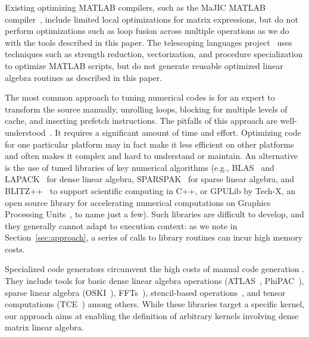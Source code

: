 \documentclass[runningheads]{llncs}
\begin{document}
Existing optimizing MATLAB compilers, such as the MaJIC MATLAB compiler~\cite{MaJIC},
include limited local optimizations for matrix expressions, but do not
perform optimizations such as loop fusion across multiple operations as we do
with the tools described in this paper. The telescoping languages
project~\cite{telescopingurl,teleoverview,Ken99} uses techniques such as
strength reduction, vectorization, and procedure specialization to optimize
MATLAB scripts, but do not generate reusable optimized linear algebra
routines as described in this paper.

The most common approach to tuning numerical codes is for an expert to
transform the source manually, unrolling loops, blocking for multiple levels
of cache, and inserting prefetch instructions.  The pitfalls of this approach
are well-understood~\cite{Goedecker01}.  It requires a significant amount of
time and effort. Optimizing code for one particular platform may in fact make
it less efficient on other platforms and often makes it complex and hard to
understand or maintain.  An alternative is the use of tuned libraries of key
numerical algorithms (e.g., BLAS~\cite{Dongarra:1990fk} and
LAPACK~\cite{LAPACK} for dense linear algebra, SPARSPAK~\cite{sparspak} for
sparse linear algebra, and BLITZ++~\cite{blitz} to support scientific
computing in C++, or GPULib by Tech-X, an open source library for
accelerating numerical computations on Graphics Processing
Units~\cite{gpulib}, to name just a few). Such libraries are difficult to
develop, and they generally cannot adapt to execution context: as we note in
Section~\ref{sec:approach}, a series of calls to library routines can incur
high memory costs.

Specialized code generators circumvent the high costs of manual code
generation . They include tools for basic dense linear algebra operations
(ATLAS~\cite{WN147}, PhiPAC~\cite{bilmes97optimizing,phipacwww}), sparse
linear algebra (OSKI~\cite{vuduc05}), FFTs~\cite{FFTW,Spiral}), stencil-based
operations~\cite{kamil06}, and tensor computations (TCE~\cite{TCE}) among
others.  While these libraries target a specific kernel, our approach aims 
at enabling the definition of arbitrary kernels involving dense matrix linear algebra.
\end{document}
